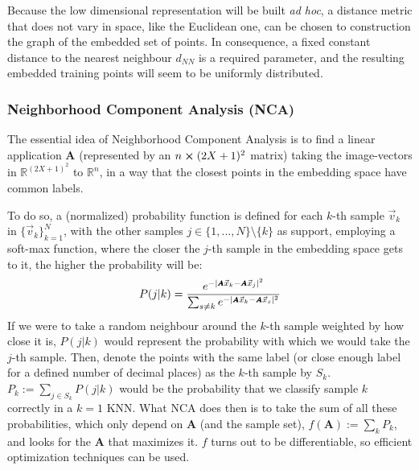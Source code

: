 \documentclass[11pt, a4paper, twoside]{article} %
\newcommand{\R}{\mathbb{R}} %
\DeclareRobustCommand{\mybox}[2][gray!10]{%
\begin{tcolorbox}[   %
        left=0.2cm,
        right=0.2cm,
        top=0.15cm,
        bottom=0.15cm,
        colback=#1,
        colframe=#1,
        width=\dimexpr\textwidth\relax, 
        enlarge left by=0mm,
        boxsep=5pt,
        arc=0pt,outer arc=0pt,
        ]
        #2
\end{tcolorbox}
}
\begin{document}
{Because the low dimensional representation will be built {\em ad hoc}, a distance metric that does not vary in space, like the Euclidean one, can be chosen to construction the graph of the embedded set of points. In consequence, a fixed constant distance to the nearest neighbour $d_{NN}$ is a required parameter, and the resulting embedded training points will seem to be uniformly distributed.
}

\subsubsection*{Neighborhood Component Analysis (NCA)}
The essential idea of Neighborhood Component Analysis \cite{NCA} is to find a linear application $\pmb{A}$ (represented by an $n\cross (2X+1)^2$ matrix) taking the image-vectors in $\R^{(2X+1)^2}$ to $\R^n$, in a way that the closest points in the embedding space have common labels. 

\mybox{To do so, a (normalized) probability function is defined for each $k$-th sample $\vec{v}_k$ in $\{\vec{v}_k\}_{k=1}^N$, with the other samples $j\in\{1,...,N\}\setminus\{k\}$ as support, employing a soft-max function, where the closer the $j$-th sample in the embedding space gets to it, the higher the probability will be:
\begin{equation}\small
P(j|k)=\frac{e^{-|\pmb{A}\vec{x}_k-\pmb{A}\vec{x}_j|^2} }{\sum_{s\neq k}e^{-|\pmb{A}\vec{x}_k-\pmb{A}\vec{x}_s|^2} }
\end{equation}
If we were to take a random neighbour around the $k$-th sample weighted by how close it is, $P(j|k)$ would represent the probability with which we would take the $j$-th sample. Then, denote the points with the same label (or close enough label for a defined number of decimal places) as the $k$-th sample by $S_k$. $P_k:=\sum_{j\in S_k}P(j|k)$ would be the probability that we classify sample $k$ correctly in a $k=1$ KNN. What NCA does then is to take the sum of all these probabilities, which only depend on $\pmb{A}$ (and the sample set), $f(\pmb{A}):=\sum_kP_k$, and looks for the $\pmb{A}$ that maximizes it. $f$ turns out to be differentiable, so efficient optimization techniques can be used.
}
\end{document}

